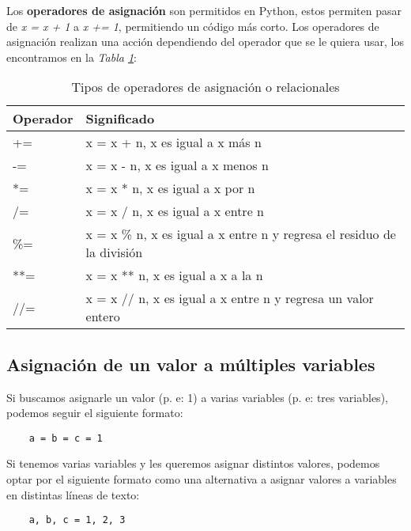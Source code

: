 Los \textbf{operadores de asignación} son permitidos en Python, estos permiten pasar de \textit{x = x + 1} a \textit{x += 1}, permitiendo un código más corto. Los operadores de asignación realizan una acción dependiendo del operador que se le quiera usar, los encontramos en la \textit{Tabla \ref{tab: 6}}:
\begin{table}[H]
    \begin{center}
        \caption{Tipos de operadores de asignación o relacionales}
        \label{tab: 6}
        \begin{tabular}{m{3cm} m{10cm}}
            \hline
            \textbf{Operador} & \textbf{Significado} \\
            \hline
            +=		& x = x + n, x es igual a x más n \\
            -=		& x = x - n, x es igual a x menos n \\
            *=		& x = x * n, x es igual a x por n \\
            /=		& x = x / n, x es igual a x entre n \\
            \%=		& x = x \% n, x es igual a x entre n y regresa el residuo de la división \\
            **=		& x = x ** n, x es igual a x a la n \\
            //=		& x = x // n, x es igual a x entre n y regresa un valor entero \\
            \hline
        \end{tabular}
    \end{center}
\end{table}


\subsection{Asignación de un valor a múltiples variables}

Si buscamos asignarle un valor (p. e: 1) a varias variables (p. e: tres variables), podemos seguir el siguiente formato:
\begin{lstlisting}
    a = b = c = 1
\end{lstlisting}

Si tenemos varias variables y les queremos asignar distintos valores, podemos optar por el siguiente formato como una alternativa a asignar valores a variables en distintas líneas de texto:
\begin{lstlisting}
    a, b, c = 1, 2, 3
\end{lstlisting}



